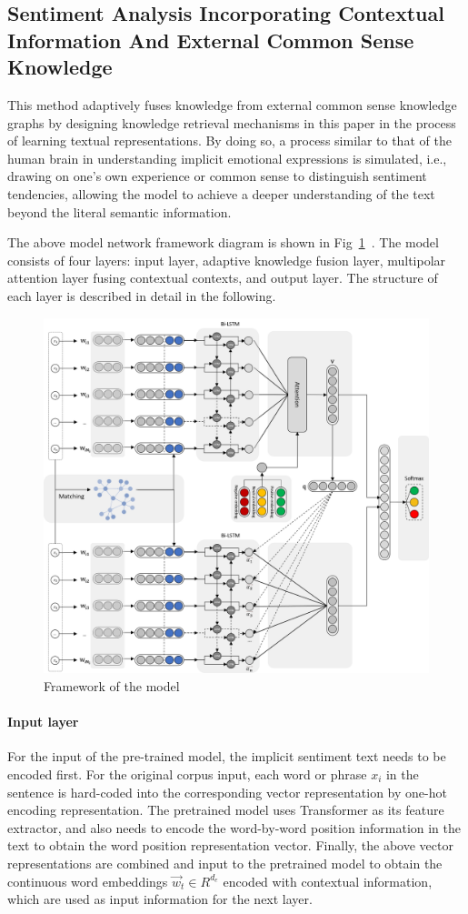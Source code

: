 \subsection{Sentiment Analysis Incorporating Contextual Information And External Common Sense Knowledge}

This method adaptively fuses knowledge from external common sense knowledge graphs by designing knowledge retrieval mechanisms in this paper in the process of learning textual representations.
By doing so, a process similar to that of the human brain in understanding implicit emotional expressions is simulated, i.e., drawing on one's own experience or common sense to distinguish sentiment tendencies, allowing the model to achieve a deeper understanding of the text beyond the literal semantic information.

The above model network framework diagram is shown in Fig~\ref{fig:framework-of-the-model}~. The model consists of four layers: input layer, adaptive knowledge fusion layer, multipolar attention layer fusing contextual contexts, and output layer. The structure of each layer is described in detail in the following.

\begin{figure}[h]
    \centering
    \includegraphics[width=0.8\linewidth]{submissions/knowledge-sentiment-analysis/1.png}
    \caption{Framework of the model}
    \label{fig:framework-of-the-model}
\end{figure}

\paragraph{Input layer}
For the input of the pre-trained model, the implicit sentiment text needs to be encoded first. For the original corpus input, each word or phrase ${x_i}$ in the sentence is hard-coded into the corresponding vector representation by one-hot encoding representation.
The pretrained model uses Transformer as its feature extractor, and also needs to encode the word-by-word position information in the text to obtain the word position representation vector. Finally, the above vector representations are combined and input to the pretrained model to obtain the continuous word embeddings $\vec{w}_{t} \in R^{d_{e}}$ encoded with contextual information, which are used as input information for the next layer.

